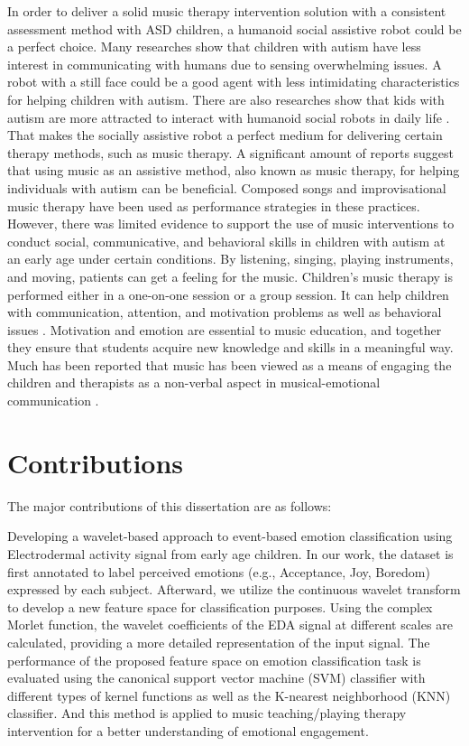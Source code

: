 In order to deliver a solid music therapy intervention solution with a consistent assessment
method with ASD children, a humanoid social assistive robot could be a perfect choice. Many researches 
show that children with autism have less interest in communicating with humans due to sensing 
overwhelming issues. A robot with a still face could be a good agent with less intimidating 
characteristics for helping children with autism. There are also researches show that 
kids with autism are more attracted to interact with humanoid social robots in daily life 
\cite{wainer2010collaborating, robins2012embodiment,costa2013your, feng2013can}.
That makes the socially assistive robot a perfect medium for delivering certain therapy methods, such as 
music therapy. A significant amount of reports suggest that using music as an assistive method, also 
known as music therapy, for helping individuals with autism can be beneficial. Composed songs and 
improvisational music therapy have been used as performance strategies in these practices. However, 
there was limited evidence to support the use of music interventions to conduct social, communicative, 
and behavioral skills in children with autism at an early age under certain conditions. By listening, 
singing, playing instruments, and moving, patients can get a feeling for the music. Children's music 
therapy is performed either in a one-on-one session or a group session. It can help children with 
communication, attention, and motivation problems as well as behavioral issues \cite{gifford2011using}. 
Motivation and emotion are essential to music education, and together they ensure that students 
acquire new knowledge and skills in a meaningful way. Much has been reported that music has been 
viewed as a means of engaging the children and therapists as a non-verbal aspect in musical-emotional 
communication \cite{warwick1991music}.\\

\section{Contributions}
The major contributions of this dissertation are as follows:
\bi
\item 
Developing a wavelet-based approach to event-based emotion classification
using Electrodermal activity signal from early age children. In our work, 
the dataset is first annotated to label perceived emotions (e.g., Acceptance, 
Joy, Boredom) expressed by each subject. Afterward, we utilize the continuous 
wavelet transform to develop a new feature space for classification purposes. 
Using the complex Morlet function, the wavelet coefficients of the EDA signal 
at different scales are calculated, providing a more detailed representation of 
the input signal. The performance of the proposed feature space on emotion 
classification task is evaluated using the canonical support vector machine 
(SVM) classifier with different types of kernel functions as well as the 
K-nearest neighborhood (KNN) classifier. And this method is applied
to music teaching/playing therapy intervention for a better
understanding of emotional engagement.\\

